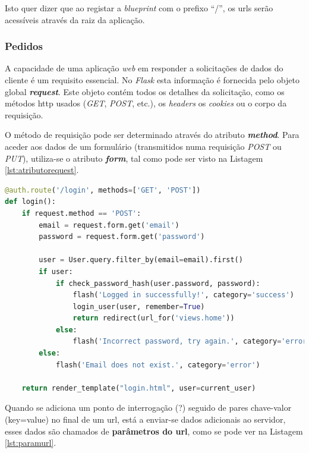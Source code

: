 Isto quer dizer que ao registar a \textit{blueprint} com o prefixo ``/'', os \acrshort{url}s serão acessíveis através da raiz da aplicação.

\subsubsection{Pedidos}
A capacidade de uma aplicação \textit{web} em responder a solicitações de dados do cliente é um requisito essencial. No \textit{Flask} esta informação é fornecida pelo objeto global \textit{\textbf{request}}. Este objeto contém todos os detalhes da solicitação, como os métodos \acrshort{http} usados (\textit{GET}, \textit{POST}, etc.), os \textit{headers} os \textit{cookies} ou o corpo da requisição.

O método de requisição pode ser determinado através do atributo \textit{\textbf{method}}. Para aceder aos dados de um formulário (transmitidos numa requisição \textit{POST} ou \textit{PUT}), utiliza-se o atributo \textit{\textbf{form}}, tal como pode ser visto na Listagem \ref{lst:atributorequest}.

\begin{minipage}{0.9\linewidth}
	\begin{lstlisting}[language=Python, caption=Exemplo atributo \textit{\textbf{request} - \textit{auth.py}}, label=lst:atributorequest]
@auth.route('/login', methods=['GET', 'POST'])
def login():
    if request.method == 'POST':
        email = request.form.get('email')
        password = request.form.get('password')

        user = User.query.filter_by(email=email).first()
        if user:
            if check_password_hash(user.password, password):
                flash('Logged in successfully!', category='success')
                login_user(user, remember=True)
                return redirect(url_for('views.home'))
            else:
                flash('Incorrect password, try again.', category='error')
        else:
            flash('Email does not exist.', category='error')

    return render_template("login.html", user=current_user)
\end{lstlisting}
\end{minipage}

Quando se adiciona um ponto de interrogação (?) seguido de pares chave-valor (key=value) no final de um \acrshort{url}, está a enviar-se dados adicionais ao servidor, esses dados são chamados de \textbf{parâmetros do \acrshort{url}}, como se pode ver na Listagem \ref{lst:paramurl}.

